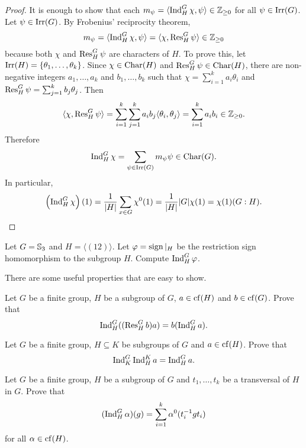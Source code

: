 \begin{proof}
    It is enough to show that
    each $m_\psi=\langle\operatorname{Ind}_H^G\chi,\psi\rangle\in\mathbb{Z}_{\geq0}$ 
    for all $\psi\in\operatorname{Irr}(G)$. Let $\psi\in\operatorname{Irr}(G)$. By 
    Frobenius' reciprocity theorem, 
    \[
    m_\psi=\langle\operatorname{Ind}_H^G\chi,\psi\rangle
    =\langle\chi,\operatorname{Res}_H^G\psi\rangle\in\mathbb{Z}_{\geq0}
    \]
    because both $\chi$ and $\operatorname{Res}_H^G\psi$ are
    characters of $H$. To prove this, let $\operatorname{Irr}(H)=\{\theta_1,\dots,\theta_k\}$. Since $\chi\in\operatorname{Char}(H)$ and 
    $\operatorname{Res}_H^G\psi\in\operatorname{Char}(H)$, there are 
    non-negative integers $a_1,\dots,a_k$ and $b_1,\dots,b_k$ such that
    $\chi=\sum_{i=1}^ka_i\theta_i$ and 
    $\operatorname{Res}_H^G\psi=\sum_{j=1}^kb_j\theta_j$. Then
    \[
\langle\chi,\operatorname{Res}_H^G\psi\rangle=\sum_{i=1}^k\sum_{j=1}^ka_ib_j\langle\theta_i,\theta_j\rangle=\sum_{i=1}^ka_ib_i\in\mathbb{Z}_{\geq0}.
    \]
    Therefore   
    \[
    \operatorname{Ind}_H^G\chi=\sum_{\psi\in\operatorname{Irr}(G)}m_{\psi}\psi\in\operatorname{Char}(G). 
    \]
    In particular, 
    \[
    \left(\operatorname{Ind}_H^G\chi\right)(1)=\frac{1}{|H|}\sum_{x\in G}\chi^0(1)=\frac{1}{|H|}|G|\chi(1)=\chi(1)(G:H).\qedhere 
    \]
\end{proof}



\begin{exercise}
\label{xca:induction_S3}
    Let $G=\mathbb{S}_3$ and $H=\langle (12)\rangle$. 
    Let $\varphi=\operatorname{sign}|_H$ be the restriction sign homomorphism 
    to the subgroup $H$. Compute 
    $\operatorname{Ind}_H^G\varphi$. 
\end{exercise}

There are some useful properties that are easy to show. 

\begin{exercise}
\label{xca:indres}
    Let $G$ be a finite group, $H$ be a subgroup of $G$, 
    $a\in\operatorname{cf}(H)$ and $b\in\operatorname{cf}(G)$. Prove that 
    \[
    \operatorname{Ind}_H^G((\operatorname{Res}_H^Gb)a)=b(\operatorname{Ind}_H^Ga).
    \]
\end{exercise}

\begin{exercise}
\label{xca:transitivity_induction}
    Let $G$ be a finite group, $H\subseteq K$ be 
    subgroups of $G$ and $a\in\operatorname{cf}(H)$. 
    Prove that 
    \[
    \operatorname{Ind}_K^G\operatorname{Ind}_H^Ka=\operatorname{Ind}_H^Ga.
    \]
\end{exercise}

\begin{exercise}
\label{xca:useful_Ind}
    Let $G$ be a finite group, $H$ be a subgroup
    of $G$ and $t_1,\dots,t_k$ be a transversal
    of $H$ in $G$. Prove that
    \[
    (\operatorname{Ind}_H^G\alpha)(g)=\sum_{i=1}^k\alpha^0(t_i^{-1}gt_i)
    \]
    for all $\alpha\in\operatorname{cf}(H)$.
\end{exercise}




